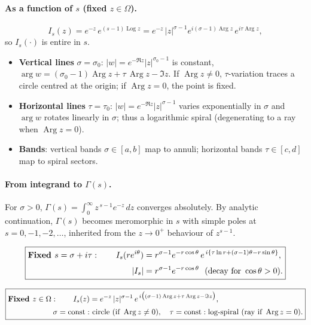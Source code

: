 \documentclass[12pt,a4paper]{article}
\DeclareMathOperator{\Arg}{Arg}
\DeclareMathOperator{\Log}{Log}
\begin{document}
\bigskip

\paragraph{As a function of \(s\) (fixed \(z\in\Omega\)).}
\[
I_s(z)=e^{-z}\,e^{(s-1)\Log z}
=e^{-z}\,|z|^{\sigma-1}e^{i(\sigma-1)\Arg z}\,e^{i\tau\Arg z},
\]
so \(I_s(\cdot)\) is entire in \(s\).

\begin{itemize}
\item \textbf{Vertical lines} \(\sigma=\sigma_0\): \(|w|=e^{-\Re z}|z|^{\sigma_0-1}\) is constant, \(\arg w=(\sigma_0-1)\Arg z+\tau\,\Arg z-\Im z\).
If \(\Arg z\neq0\), \(\tau\)-variation traces a circle centred at the origin; if \(\Arg z=0\), the point is fixed.
\item \textbf{Horizontal lines} \(\tau=\tau_0\): \(|w|=e^{-\Re z}|z|^{\sigma-1}\) varies exponentially in \(\sigma\) and \(\arg w\) rotates linearly in \(\sigma\); thus a logarithmic spiral (degenerating to a ray when \(\Arg z=0\)).
\item \textbf{Bands}: vertical bands \(\sigma\in[a,b]\) map to annuli; horizontal bands \(\tau\in[c,d]\) map to spiral sectors.
\end{itemize}

\bigskip

\paragraph{From integrand to \(\Gamma(s)\).}
For \(\sigma>0\), \(\Gamma(s)=\int_0^{\infty} z^{\,s-1}e^{-z}\,dz\) converges absolutely.
By analytic continuation, \(\Gamma(s)\) becomes meromorphic in \(s\) with simple poles at \(s=0,-1,-2,\dots\), inherited from the \(z\to0^+\) behaviour of \(z^{s-1}\).

\bigskip


\[
\boxed{%
\begin{aligned}
\textbf{Fixed }s=\sigma+i\tau:\qquad
I_s(re^{i\theta})
&=r^{\sigma-1}e^{-r\cos\theta}\,e^{\,i\{\tau\ln r+(\sigma-1)\theta-r\sin\theta\}},\\[2pt]
|I_s|&=r^{\sigma-1}e^{-r\cos\theta}\ \ \text{(decay for }\cos\theta>0).
\end{aligned}}
\]

\bigskip

\[
\boxed{%
\begin{aligned}
\textbf{Fixed }z\in\Omega:\qquad
I_s(z)
&=e^{-z}\,|z|^{\sigma-1}\,e^{\,i\big((\sigma-1)\Arg z+\tau\Arg z - \Im z\big)},\\[2pt]
\sigma=\text{const}:&\ \text{circle (if }\Arg z\neq0),\quad
\tau=\text{const}: \text{log-spiral (ray if }\Arg z=0).
\end{aligned}}
\]
\end{document}

